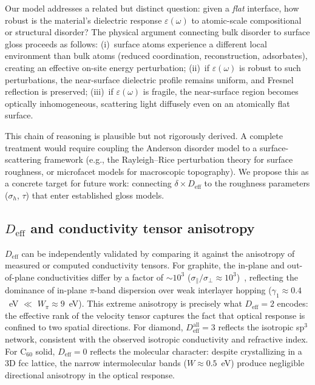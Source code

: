 \documentclass[twocolumn,showpacs,preprintnumbers,amsmath,amssymb,prb]{revtex4-2}
\begin{document}
Our model addresses a related but distinct question: given a
\emph{flat} interface, how robust is the material's dielectric
response $\varepsilon(\omega)$ to atomic-scale compositional or
structural disorder? The physical argument connecting bulk disorder
to surface gloss proceeds as follows: (i)~surface atoms experience
a different local environment than bulk atoms (reduced coordination,
reconstruction, adsorbates), creating an effective on-site energy
perturbation; (ii)~if $\varepsilon(\omega)$ is robust to such
perturbations, the near-surface dielectric profile remains uniform,
and Fresnel reflection is preserved; (iii)~if $\varepsilon(\omega)$
is fragile, the near-surface region becomes optically inhomogeneous,
scattering light diffusely even on an atomically flat surface.

This chain of reasoning is plausible but not rigorously derived.
A complete treatment would require coupling the Anderson disorder
model to a surface-scattering framework (e.g., the Rayleigh--Rice
perturbation theory for surface roughness, or microfacet models for
macroscopic topography). We propose this as a concrete target for
future work: connecting $\delta \times D_\mathrm{eff}$ to the
roughness parameters ($\sigma_h$, $\tau$) that enter established
gloss models.

\subsection{$D_\mathrm{eff}$ and conductivity tensor anisotropy}

$D_\mathrm{eff}$ can be independently validated by comparing it against
the anisotropy of measured or computed conductivity tensors. For
graphite, the in-plane and out-of-plane conductivities differ by a
factor of $\sim$$10^3$ ($\sigma_\parallel / \sigma_\perp \approx
10^3$)~\cite{Spain1981}, reflecting the dominance of in-plane $\pi$-band
dispersion over weak interlayer hopping ($\gamma_1 \approx 0.4$~eV
$\ll$ $W_\pi \approx 9$~eV). This extreme anisotropy is precisely
what $D_\mathrm{eff} = 2$ encodes: the effective rank of the velocity
tensor captures the fact that optical response is confined to two
spatial directions. For diamond, $D_\mathrm{eff}^\mathrm{all} = 3$
reflects the isotropic sp$^3$ network, consistent with the observed
isotropic conductivity and refractive index. For C$_{60}$ solid,
$D_\mathrm{eff} = 0$ reflects the molecular character: despite
crystallizing in a 3D fcc lattice, the narrow intermolecular bands
($W \approx 0.5$~eV) produce negligible directional anisotropy
in the optical response.
\end{document}
